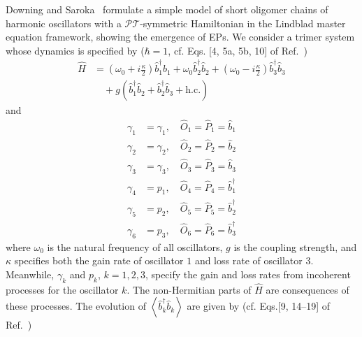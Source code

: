 \documentclass[5p, twocolumn, 10pt, sort&compress]{elsarticle}
\newcounter{bla}
\newcommand{\expval}[1]{\left\langle{#1}\right\rangle}
\newcommand{\bop}{\hat{b}}
\newcommand{\bdag}{\bop^\dagger}
\begin{document}
Downing and Saroka~\cite{Downing2021} formulate a simple model of short oligomer chains of harmonic oscillators with a $\mathcal{P}\mathcal{T}$-symmetric Hamiltonian in the Lindblad master equation framework, showing the emergence of EPs. We consider a trimer system whose dynamics is specified by ($\hbar=1$, cf. Eqs. [4, 5a, 5b, 10] of Ref.~\cite{Downing2021})
\begin{equation}
\begin{split}
    \hat{H} &= \left(\omega_0+i\frac{\kappa}{2}\right)\bdag_1\bop_1 + \omega_0\bdag_2\bop_2 + \left(\omega_0-i\frac{\kappa}{2}\right)\bdag_3\bop_3
    \\
    &\quad + g\left(\bdag_1\bop_2+\bdag_2\bop_3+\mathrm{h.c.}\right)
\end{split}
\end{equation}
and
\begin{subequations}
\begin{align}
    \gamma_1&=\gamma_1,\quad \hat{O}_1=\hat{P}_1=\bop_1
    \\
    \gamma_2&=\gamma_2,\quad \hat{O}_2=\hat{P}_2=\bop_2
    \\
    \gamma_3&=\gamma_3,\quad \hat{O}_3=\hat{P}_3=\bop_3
    \\
    \gamma_4&=p_1,\quad \hat{O}_4=\hat{P}_4=\bdag_1
    \\
    \gamma_5&=p_2,\quad \hat{O}_5=\hat{P}_5=\bdag_2
    \\
    \gamma_6&=p_3,\quad \hat{O}_6=\hat{P}_6=\bdag_3
\end{align}
\end{subequations}
where $\omega_0$ is the natural frequency of all oscillators, $g$ is the coupling strength, and $\kappa$ specifies both the gain rate of oscillator $1$ and loss rate of oscillator $3$. Meanwhile, $\gamma_k$ and $p_k$, $k=1,2,3$, specify the gain and loss rates from incoherent processes for the oscillator $k$. The non-Hermitian parts of $\hat{H}$ are consequences of these processes. The evolution of $\expval{\bdag_k\bop_k}$ are given by (cf. Eqs.[9, 14--19] of Ref.~\cite{Downing2021})
\end{document}
